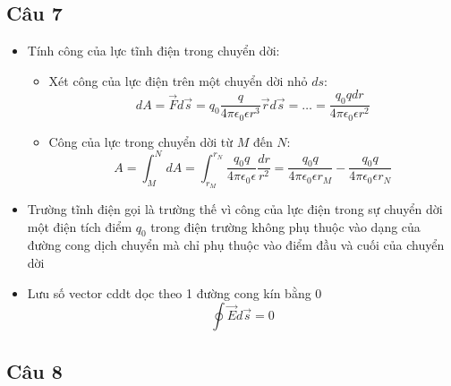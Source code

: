 \subsection{Câu 7}

\begin{itemize}
  \item Tính công của lực tĩnh điện trong chuyển dời:
  \begin{itemize}
    \item Xét công của lực điện trên một chuyển dời nhỏ $ds$:
    \begin{equation*}
      dA = \vec{F}d\vec{s} = q_0 \frac{q}{4\pi\epsilon_0\epsilon r^3} \vec{r}d\vec{s} = \dots = \frac{q_0qdr}{4\pi\epsilon_0\epsilon r^2}
    \end{equation*}
    \item Công của lực trong chuyển dời từ $M$ đến $N$:
    \begin{equation*}
      A = \int_{M}^{N} dA = \int_{r_M}^{r_N} \frac{q_0q}{4\pi\epsilon_0\epsilon} \frac{dr}{r^2} = \frac{q_0q}{4\pi\epsilon_0\epsilon r_M} - \frac{q_0q}{4\pi\epsilon_0\epsilon r_N}
    \end{equation*}
  \end{itemize}
  \item Trường tĩnh điện gọi là trường thế vì công của lực điện trong sự chuyển dời một điện tích điểm $q_0$ trong điện trường không phụ thuộc vào dạng của đường cong dịch chuyển mà chỉ phụ thuộc vào điểm đầu và cuối của chuyển dời
  \item Lưu số vector cddt dọc theo 1 đường cong kín bằng 0
  \begin{equation*}
    \oint \vec{E}d\vec{s} = 0
  \end{equation*}
\end{itemize}

\subsection{Câu 8}

